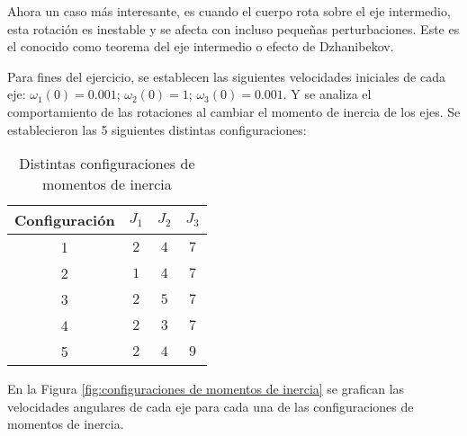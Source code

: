 \documentclass[letterpaper, 12pt]{article}
\begin{document}
\begin{enumerate}
\begin{enumerate}
Ahora un caso más interesante, es cuando el cuerpo rota sobre el eje intermedio, esta rotación es inestable y  se afecta con incluso pequeñas perturbaciones. Este es el conocido como teorema del eje intermedio o efecto de Dzhanibekov.

Para fines del ejercicio, se establecen las siguientes velocidades iniciales de cada eje:
$\omega_1(0) = 0.001$; $\omega_2(0) = 1$; $\omega_3(0) = 0.001$.
Y se analiza el comportamiento de las rotaciones al cambiar el momento de inercia de los ejes.
Se establecieron las 5 siguientes distintas configuraciones:

\begin{table}[H]
\centering
\begin{tabular}{|c|c|c|c|}
    \hline
    Configuración & $J_1$ & $J_2$ & $J_3$ \\
    \hline
    1   & $2$   & $4$   & $7$   \\
    2   & $1$   & $4$   & $7$   \\
    3   & $2$   & $5$   & $7$   \\
    4   & $2$   & $3$   & $7$   \\
    5   & $2$   & $4$   & $9$   \\
    \hline
\end{tabular}
\caption{Distintas configuraciones de momentos de inercia}
\label{tab:configuraciones de momentos de inercia}
\end{table}

En la Figura \ref{fig:configuraciones de momentos de inercia} se grafican las velocidades angulares de cada eje para cada una de las configuraciones de momentos de inercia.


\end{enumerate}
\end{enumerate}
\end{document}

